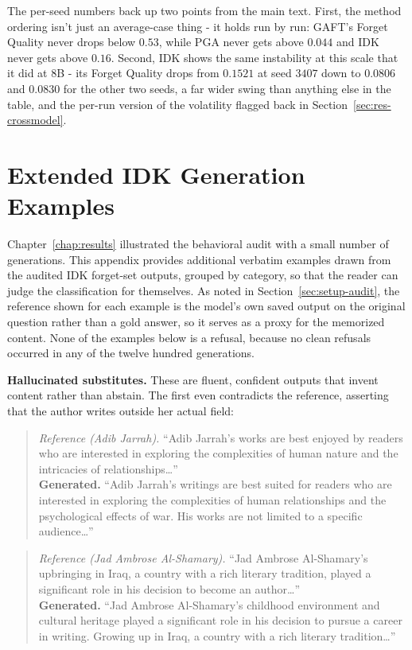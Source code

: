 \documentclass[a4paper,12pt]{report}
\begin{document}
The per-seed numbers back up two points from the main text. First, the method ordering isn't just an average-case thing - it holds run by run: GAFT's Forget Quality never drops below $0.53$, while PGA never gets above $0.044$ and IDK never gets above $0.16$. Second, IDK shows the same instability at this scale that it did at 8B - its Forget Quality drops from $0.1521$ at seed $3407$ down to $0.0806$ and $0.0830$ for the other two seeds, a far wider swing than anything else in the table, and the per-run version of the volatility flagged back in Section~\ref{sec:res-crossmodel}.
\chapter{Extended IDK Generation Examples}
\label{app:examples}
Chapter~\ref{chap:results} illustrated the behavioral audit with a small number of generations. This appendix provides additional verbatim examples drawn from the audited IDK forget-set outputs, grouped by category, so that the reader can judge the classification for themselves. As noted in Section~\ref{sec:setup-audit}, the reference shown for each example is the model's own saved output on the original question rather than a gold answer, so it serves as a proxy for the memorized content. None of the examples below is a refusal, because no clean refusals occurred in any of the twelve hundred generations.

\textbf{Hallucinated substitutes.} These are fluent, confident outputs that invent content rather than abstain. The first even contradicts the reference, asserting that the author writes outside her actual field:

\begin{quote}\small
\textit{Reference (Adib Jarrah).} ``Adib Jarrah's works are best enjoyed by readers who are interested in exploring the complexities of human nature and the intricacies of relationships\ldots''\\
\textbf{Generated.} ``Adib Jarrah's writings are best suited for readers who are interested in exploring the complexities of human relationships and the psychological effects of war. His works are not limited to a specific audience\ldots''
\end{quote}

\begin{quote}\small
\textit{Reference (Jad Ambrose Al-Shamary).} ``Jad Ambrose Al-Shamary's upbringing in Iraq, a country with a rich literary tradition, played a significant role in his decision to become an author\ldots''\\
\textbf{Generated.} ``Jad Ambrose Al-Shamary's childhood environment and cultural heritage played a significant role in his decision to pursue a career in writing. Growing up in Iraq, a country with a rich literary tradition\ldots''
\end{quote}
\end{document}
